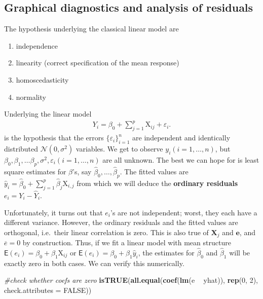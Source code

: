 \documentclass[
]{book}
\newenvironment{Shaded}{\begin{snugshade}}{\end{snugshade}}
\newcommand{\CommentTok}[1]{\textcolor[rgb]{0.56,0.35,0.01}{\textit{#1}}}
\newcommand{\DataTypeTok}[1]{\textcolor[rgb]{0.13,0.29,0.53}{#1}}
\newcommand{\DecValTok}[1]{\textcolor[rgb]{0.00,0.00,0.81}{#1}}
\newcommand{\KeywordTok}[1]{\textcolor[rgb]{0.13,0.29,0.53}{\textbf{#1}}}
\newcommand{\NormalTok}[1]{#1}
\newcommand{\OperatorTok}[1]{\textcolor[rgb]{0.81,0.36,0.00}{\textbf{#1}}}
\newcommand{\OtherTok}[1]{\textcolor[rgb]{0.56,0.35,0.01}{#1}}
\newcommand{\StringTok}[1]{\textcolor[rgb]{0.31,0.60,0.02}{#1}}
\providecommand{\tightlist}{%
  \setlength{\itemsep}{0pt}\setlength{\parskip}{0pt}}
\begin{document}
\hypertarget{graphical-diagnostics-and-analysis-of-residuals}{%
\subsection{Graphical diagnostics and analysis of residuals}\label{graphical-diagnostics-and-analysis-of-residuals}}

The hypothesis underlying the classical linear model are

\begin{enumerate}
\def\labelenumi{\arabic{enumi}.}
\tightlist
\item
  independence
\item
  linearity (correct specification of the mean response)
\item
  homoscedasticity
\item
  normality
\end{enumerate}

Underlying the linear model
\begin{align*}
Y_i = \beta_0 + \sum_{j=1}^p \mathrm{X}_{ij} + \varepsilon_i.
\end{align*}
is the hypothesis that the errors \(\{\varepsilon_i\}_{i=1}^n\) are independent and identically distributed \(\mathcal{N}(0, \sigma^2)\) variables. We get to observe \(y_i (i=1,\ldots,n)\), but \(\beta_0, \beta_1, \ldots \beta_p, \sigma^2, \varepsilon_i (i=1,\ldots,n)\) are all unknown. The best we can hope for is
least square estimates for \(\beta\)'s, say \(\widehat{\beta}_0, \ldots, \widehat{\beta}_p\).
The fitted values are \(\widehat{y}_i=\widehat{\beta}_0 + \sum_{j=1}^p \widehat{\beta}_j \mathrm{X}_{i,j}\) from which we will deduce the \textbf{ordinary residuals} \(e_i = Y_i - \widehat{Y}_i\).

Unfortunately, it turns out that \(e_i\)'s are not independent; worst, they each have a different variance. However, the ordinary residuals and the fitted values are orthogonal, i.e.~their linear correlation is zero. This is also true of \(\mathbf{X}_j\) and \(\boldsymbol{e}\), and \(\overline{e} = 0\) by construction. Thus, if we fit a linear model with mean structure \(\mathsf{E}(e_i) = \beta_0 + \beta_1\mathrm{X}_{ij}\) or \(\mathsf{E}(e_i) = \beta_0 + \beta_1 \widehat{y}_i\), the estimates for \(\widehat{\beta}_0\) and \(\widehat{\beta}_1\) will be exactly zero in both cases. We can verify this numerically.

\begin{Shaded}
\begin{Highlighting}[]
\CommentTok{#check whether coefs are zero}
\KeywordTok{isTRUE}\NormalTok{(}\KeywordTok{all.equal}\NormalTok{(}\KeywordTok{coef}\NormalTok{(}\KeywordTok{lm}\NormalTok{(e }\OperatorTok{~}\StringTok{ }\NormalTok{yhat)), }\KeywordTok{rep}\NormalTok{(}\DecValTok{0}\NormalTok{, }\DecValTok{2}\NormalTok{), }\DataTypeTok{check.attributes =} \OtherTok{FALSE}\NormalTok{))}
\end{Highlighting}
\end{Shaded}
\end{document}

